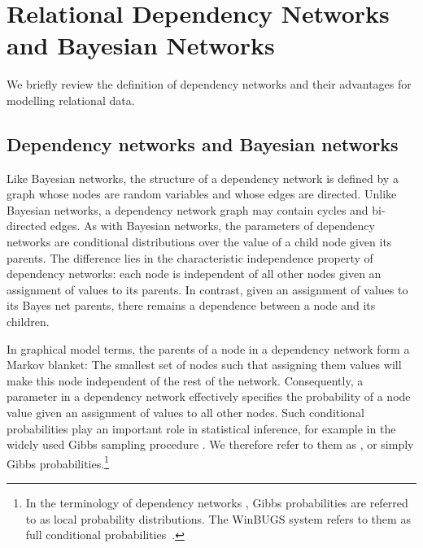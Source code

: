 \documentclass[runningheads,a4paper]{llncs}
\begin{document}
 \section{Relational Dependency Networks and Bayesian Networks} We briefly review the definition of dependency networks and their advantages for modelling relational data. 
 
 \subsection{Dependency networks and Bayesian networks} Like Bayesian networks, the structure of a dependency network is defined by a graph whose nodes are random variables and whose edges are directed. Unlike Bayesian networks, a dependency network graph may contain cycles and bi-directed edges. As with Bayesian networks, the parameters of dependency networks are conditional distributions over the value of a child node given its parents. The difference lies in the characteristic independence property of dependency networks: each node is independent of all other nodes given an assignment of values to its parents. In contrast, given an assignment of values to its Bayes net parents, there remains a dependence between a node and its children.

In graphical model terms, the parents of a node in a dependency network form a Markov blanket: The smallest set of nodes such that assigning them values will make this node independent of the rest of the network. Consequently, a parameter in a dependency network effectively specifies the probability of a node value given an assignment of values to all other nodes. Such conditional probabilities play an important role in statistical inference, for example in the widely used Gibbs sampling procedure \cite{Lunn2000}. We therefore refer to them as , or simply Gibbs probabilities.\footnote{In the terminology of dependency networks \cite{Heckerman2000},  Gibbs  probabilities are referred to as local probability distributions. The WinBUGS system refers to them as full conditional probabilities~\cite{Lunn2000}.}
\end{document}
